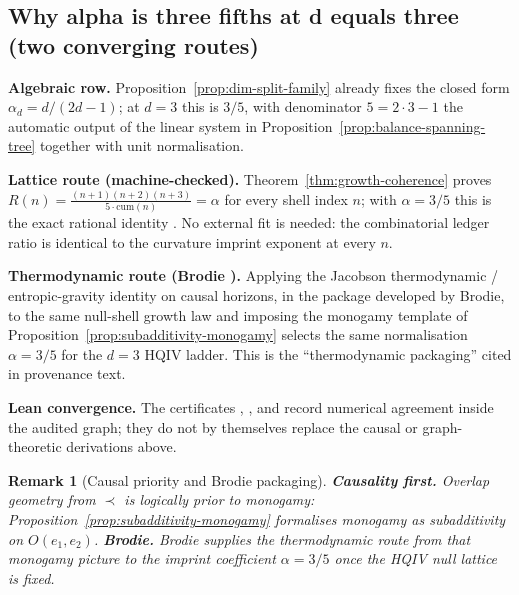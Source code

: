 \documentclass[11pt]{amsart}
\newtheorem{remark}[theorem]{Remark}
\begin{document}
\subsection{Why alpha is three fifths at d equals three (two converging routes)}
\label{subsec:alpha-three-fifths}

\textbf{Algebraic row.} Proposition~\ref{prop:dim-split-family} already fixes the closed form \(\alpha_d=d/(2d-1)\); at \(d=3\) this is \(3/5\), with denominator \(5=2\cdot 3-1\) the automatic output of the linear system in Proposition~\ref{prop:balance-spanning-tree} together with unit normalisation.

\textbf{Lattice route (machine-checked).} Theorem~\ref{thm:growth-coherence} proves \(R(n)=\frac{(n+1)(n+2)(n+3)}{5\cdot \mathrm{cum}(n)}=\alpha\) for every shell index \(n\); with \(\alpha=3/5\) this is the exact rational identity . No external fit is needed: the combinatorial ledger ratio is identical to the curvature imprint exponent at every \(n\).

\textbf{Thermodynamic route (Brodie \cite{brodie2026}).} Applying the Jacobson thermodynamic / entropic-gravity identity on causal horizons, in the package developed by Brodie, to the same null-shell growth law and imposing the monogamy template of Proposition~\ref{prop:subadditivity-monogamy} selects the same normalisation \(\alpha=3/5\) for the \(d=3\) HQIV ladder. This is the ``thermodynamic packaging'' cited in  provenance text.

\textbf{Lean convergence.} The certificates , , and  record numerical agreement inside the audited graph; they do not by themselves replace the causal or graph-theoretic derivations above.

\begin{remark}[Causal priority and Brodie packaging]
\label{rem:causality-monogamy-brodie}
\textbf{Causality first.} Overlap geometry from \(\prec\) is logically prior to monogamy: Proposition~\ref{prop:subadditivity-monogamy} formalises monogamy as subadditivity on \(O(e_1,e_2)\). \textbf{Brodie.} Brodie \cite{brodie2026} supplies the thermodynamic route from that monogamy picture to the imprint coefficient \(\alpha=3/5\) once the HQIV null lattice is fixed.
\end{remark}
\end{document}
